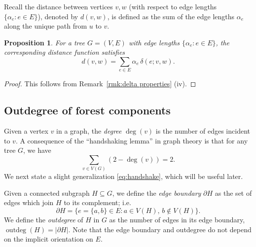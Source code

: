 \documentclass[12pt]{amsart}
\newtheorem{prop}[thm]{Proposition}
\theoremstyle{definition}
\DeclareMathOperator{\outdeg}{outdeg}
\begin{document}
Recall the distance between vertices $v,w$ (with respect to edge lengths $\{ \alpha_e \colon e \in E\}$), denoted by $d(v,w)$, is defined as the sum of the edge lengths $\alpha_e$ along the unique path from $u$ to $v$. 

\begin{prop}
\label{prop:distance-sum}
For a tree $G = (V,E)$ with edge lengths $\{\alpha_e \colon e \in E\}$, the corresponding distance function satisfies
\[ 
	d(v,w) = \sum_{e \in E} \alpha_e \, \delta(e; v,w) .
\]
\end{prop}
\begin{proof}
This follows from Remark~\ref{rmk:delta properties} (iv).
\end{proof}


\subsection{Outdegree of forest components}
\label{sec:outdegree}

Given a vertex $v$ in a graph, the {\em degree} $\deg(v)$ is the number of edges incident to $v$.
A consequence of the ``handshaking lemma'' in graph theory is that for any tree $G$, we have
\begin{equation}
\label{eq:handshake}
	\sum_{v \in V(G)} (2 - \deg(v)) = 2.
\end{equation}
We next state a slight generalization \eqref{eq:handshake}, which will be useful later.

Given a connected subgraph $H \subseteq G$,
we define the {\em edge boundary} $\partial H$ as the set of edges which join $H$ to its complement; i.e.
\begin{equation}
	\partial H = \{ e = \{a,b\} \in E \colon a \in V(H),\, b \not\in V(H)\}.
\end{equation}
We define the {\em outdegree} of $H$ in $G$ as the number of edges in its edge boundary, $\outdeg(H) = |\partial H|$. 
Note that the edge boundary and outdegree do not depend on the implicit orientation on $E$.
\end{document}
